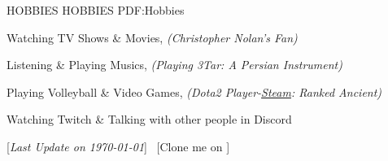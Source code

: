 \documentclass[letterpaper,MMMyyyy,nonstopmode]{resume}
\newcommand{\CVNote}{Last Update on \today}
\begin{document}
\begin{Body}






\Section
{HOBBIES}
{HOBBIES}
{PDF:Hobbies}

\BigGap
\BulletItem
Watching TV Shows \& Movies, \textit{(Christopher Nolan's Fan)}

\Gap
\BulletItem
Listening \& Playing Musics, \textit{(Playing 3Tar: A Persian Instrument)}

\Gap
\BulletItem
Playing Volleyball \& Video Games, \textit{(Dota2 Player-\href{https://steamcommunity.com/id/aliyazdi/}{Steam}: Ranked Ancient)}

\Gap
\BulletItem
Watching Twitch \& Talking with other people in Discord


\UseNoteFont
\BigGap
\hfill
[\textit{\CVNote}]
\SubBulletSymbol\,
[Clone me on
\href{https://github.com/aliyazdi75/Resume}
{\faGithub}]

\end{Body}
\end{document}

